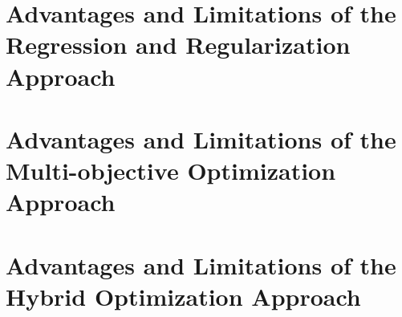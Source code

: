 


\section{Advantages and Limitations of the Regression and Regularization Approach}
\section{Advantages and Limitations of the Multi-objective Optimization Approach}
\section{Advantages and Limitations of the Hybrid Optimization Approach}

